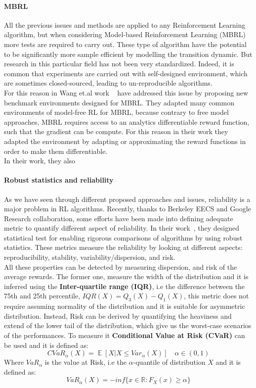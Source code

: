 \documentclass{article}
\DeclareMathOperator{\EX}{\mathbb{E}}%
\begin{document}
\paragraph{MBRL}
All the previous issues and methods are applied to any Reinforcement Learning algorithm, but when considering Model-based Reinforcement Learning (MBRL) more tests are required to carry out. These type of algorithm have the potential to be significantly more sample efficient by modelling the transition dynamic. But research in this particular field has not been very standardized. Indeed, it is common that experiments are carried out with self-designed environment, which are sometimes closed-sourced, leading to un-reproducible algorithms.\\
For this reason in Wang et.al work ~\cite{MBRLBenchmarking} have addressed this issue by proposing new benchmark environments designed for MBRL. They adapted many common environments of model-free RL for MBRL, because
contrary to free model approaches, MBRL requires access to an analytics differentiable reward function, such that the gradient can be compute. For this reason in their work they adapted the environment by adapting or approximating the reward functions in order to make them differentiable.\\
In their work, they also 


\paragraph{Robust statistics and reliability}
As we have seen through different proposed approaches and issues, reliability is a major problem in RL algorithms. Recently, thanks to  Berkeley EECS and Google Research collaboration, some efforts have been made into defining adequate metric to quantify different aspect of reliability. In their work~\cite{GoogleMeasure}, they designed statistical test for enabling rigorous comparisons of algorithms by using robust statistics. These metrics measure the reliability by looking at different aspects: reproducibility, stability, variability/dispersion, and risk.\\
All these properties can be detected by measuring dispersion, and risk of the average rewards. The former one, measure the width of the distribution and it is inferred using the \textbf{Inter-quartile range (IQR)}, i.e the difference between the 75th and 25th percentile, $ IQR(X) = Q_3(X) - Q_1(X)$, this metric does not require assuming normality of the distribution and it is suitable for asymmetric distribution.
Instead, Risk can be derived by quantifying the heaviness and extend of the lower tail of the distribution, which give us the worst-case scenarios of the performances. To measure it \textbf{Conditional Value at Risk (CVaR)} can be used and it is defined as:
\begin{equation}
CVaR_\alpha(X) = \EX \left[ X \vert X \leq Var_\alpha(X) \right]  \quad \alpha \in (0,1)
\end{equation}
Where $VaR_\alpha$ is the value at Risk, i.e the $\alpha$-quantile of distribution $X$ and it is defined as:
\begin{equation}
VaR_\alpha(X) = -inf \{ x \in \mathbb{R}: F_X(x) \ge \alpha \}
\end{equation}
\end{document}

